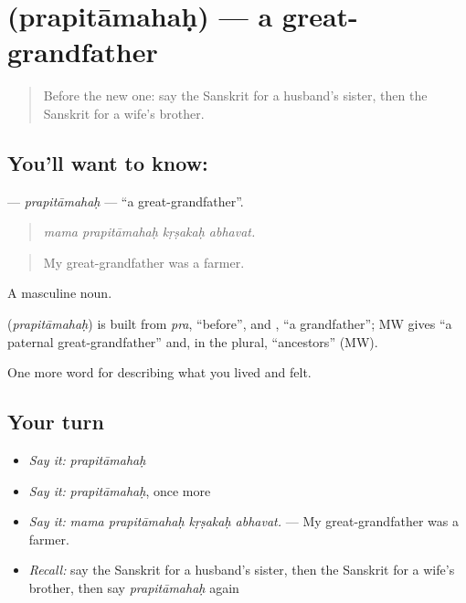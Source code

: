 \section[\texorpdfstring{\sk{प्रपितामहः} (prapitāmahaḥ)}{प्रपितामहः (prapitāmahaḥ)}]{ (prapitāmahaḥ) — a great-grandfather}

\label{lesson:SA-C500-prapitamahah}



\begin{quote}
Before the new one: say the Sanskrit for a husband's sister, then the Sanskrit for a wife's brother.
\end{quote}

\subsection*{You'll want to know: }
\textbf{} — \emph{prapitāmahaḥ} — \textquotedblleft{}a great-grandfather\textquotedblright{}.

\begin{quote}
   
\end{quote}

\begin{quote}
\emph{mama prapitāmahaḥ kṛṣakaḥ abhavat.}
\end{quote}

\begin{quote}
My great-grandfather was a farmer.
\end{quote}

A masculine noun.

\begin{cousinweb}
\textbf{} (\emph{prapitāmahaḥ}) is built from \emph{pra}, \textquotedblleft{}before\textquotedblright{}, and \textbf{}, \textquotedblleft{}a grandfather\textquotedblright{}; MW gives \textquotedblleft{}a paternal great-grandfather\textquotedblright{} and, in the plural, \textquotedblleft{}ancestors\textquotedblright{} (MW).
\end{cousinweb}

\begin{grammarlens}[title={What you've built}]
One more word for describing what you lived and felt.
\end{grammarlens}

\subsection*{Your turn}
\begin{itemize}
\raggedright
  \item \emph{Say it:} \emph{prapitāmahaḥ}
  \item \emph{Say it:} \emph{prapitāmahaḥ}, once more
  \item \emph{Say it:} \emph{mama prapitāmahaḥ kṛṣakaḥ abhavat.} — My great-grandfather was a farmer.
  \item \emph{Recall:} say the Sanskrit for a husband's sister, then the Sanskrit for a wife's brother, then say \emph{prapitāmahaḥ} again
\end{itemize}

